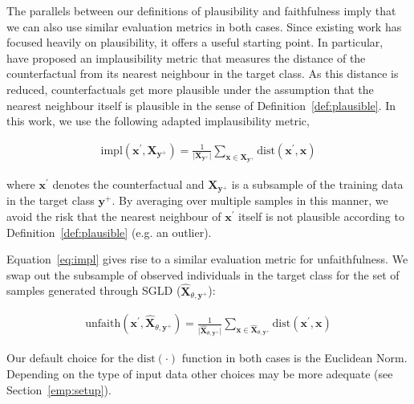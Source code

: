 \documentclass[letterpaper]{article} %
\begin{document}
The parallels between our definitions of plausibility and faithfulness imply that we can also use similar evaluation metrics in both cases. Since existing work has focused heavily on plausibility, it offers a useful starting point. In particular,~\citet{guidotti2022counterfactual} have proposed an implausibility metric that measures the distance of the counterfactual from its nearest neighbour in the target class. As this distance is reduced, counterfactuals get more plausible under the assumption that the nearest neighbour itself is plausible in the sense of Definition~\ref{def:plausible}. In this work, we use the following adapted implausibility metric,

\begin{equation}\label{eq:impl}
  \begin{aligned}
    \text{impl}(\mathbf{x}^{\prime},\mathbf{X}_{\mathbf{y}^+}) = \frac{1}{\lvert\mathbf{X}_{\mathbf{y}^+}\rvert} \sum_{\mathbf{x} \in \mathbf{X}_{\mathbf{y}^+}} \text{dist}(\mathbf{x}^{\prime},\mathbf{x})
  \end{aligned}
\end{equation}

where $\mathbf{x}^{\prime}$ denotes the counterfactual and $\mathbf{X}_{\mathbf{y}^+}$ is a subsample of the training data in the target class $\mathbf{y}^+$. By averaging over multiple samples in this manner, we avoid the risk that the nearest neighbour of $\mathbf{x}^{\prime}$ itself is not plausible according to Definition~\ref{def:plausible} (e.g. an outlier).

Equation~\ref{eq:impl} gives rise to a similar evaluation metric for unfaithfulness. We swap out the subsample of observed individuals in the target class for the set of samples generated through SGLD ($\widehat{\mathbf{X}}_{\theta,\mathbf{y}^+}$):

\begin{equation}\label{eq:faith}
  \begin{aligned}
    \text{unfaith}(\mathbf{x}^{\prime},\widehat{\mathbf{X}}_{\theta,\mathbf{y}^+}) = \frac{1}{\lvert \widehat{\mathbf{X}}_{\theta,\mathbf{y}^+} \rvert} \sum_{\mathbf{x} \in \widehat{\mathbf{X}}_{\theta,\mathbf{y}^+}} \text{dist}(\mathbf{x}^{\prime},\mathbf{x})
  \end{aligned}
\end{equation}

Our default choice for the $\text{dist}(\cdot)$ function in both cases is the Euclidean Norm. Depending on the type of input data other choices may be more adequate (see Section~\ref{emp:setup}). 
\end{document}
